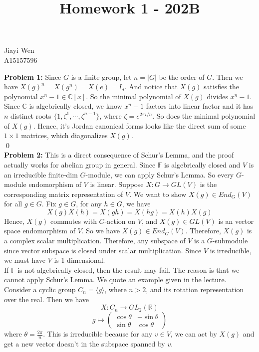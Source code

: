 \documentclass[12pt]{amsart}
\newcommand{\R}{\mathbb{R}}
\newcommand{\C}{\mathbb{C}}
\newcommand{\F}{\mathbb{F}}
\begin{document}
\title{Homework 1 - 202B}
\maketitle
\begin{center}
    Jiayi Wen\\
    A15157596
\end{center}
\textbf{Problem 1:}
Since $G$ is a finite group, let $n=|G|$ be the order of $G$. Then we have $X(g)^n=X(g^n)=X(e)=I_d$. And notice that $X(g)$ satisfies the polynomial $x^n-1\in \C[x]$. So the minimal polynomial of $X(g)$ divides $x^n-1$. Since $\C$ is algebrically closed, we know $x^n-1$ factors into linear factor and it has $n$ distinct roots $\{1,\zeta^1,\cdots,\zeta^{n-1}\}$, where $\zeta=e^{2\pi i/n}$. So does the minimal polynomial of $X(g)$. Hence, it's Jordan canonical forms looks like the direct sum of some $1\times 1$ matrices, which diagonalizes $X(g)$. 
\\\qed\\
\textbf{Problem 2:} This is a direct consequence of Schur's Lemma, and the proof actually works for abelian group in general. Since $\F$ is algebrically closed and $V$ is an irreducible finite-dim $G$-module, we can apply Schur's Lemma. So every $G$-module endomorphism of $V$ is linear. Suppose $X:G\to GL(V)$ is the corresponding matrix representation of $V$. We want to show $X(g)\in End_G(V)$ for all $g\in G$. Fix $g\in G$, for any $h\in G$, we have 
\[X(g)X(h)=X(gh)=X(hg)=X(h)X(g)\]
Hence, $X(g)$ commutes with $G$-action on $V$, and $X(g)\in GL(V)$ is an vector space endomorphism of $V$. So we have $X(g)\in End_G(V)$. Therefore, $X(g)$ is a complex scalar multiplication. Therefore, any subspace of $V$ is a $G$-submodule since vector subspace is closed under scalar multiplication. Since $V$ is irreducible, we must have $V$ is 1-dimensional.\\
If $\F$ is not algebrically closed, then the result may fail. The reason is that we cannot apply Schur's Lemma. We quote an example given in the lecture. Consider a cyclic group $C_n=\langle g\rangle$, where $n>2$, and its rotation representation over the real. Then we have 
\[X:C_n\to GL_2(\R)\]
\[g\mapsto \begin{pmatrix}
    \cos\theta & -\sin\theta\\
    \sin\theta & \cos\theta

\end{pmatrix}\]
where $\theta = \frac{2\pi}{n}$. This is irreducible because for any $v\in V$, we can act by $X(g)$ and get a new vector doesn't in the subspace spanned by $v$.
\end{document}
